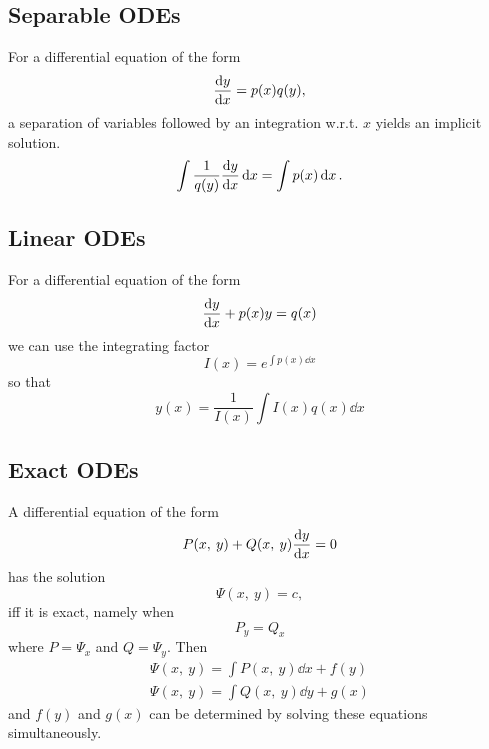 \documentclass{article}
\begin{document}
\subsection{Separable ODEs}
For a differential equation of the form
\begin{equation*}
    \dv{y}{x} = p(x) q(y),
\end{equation*}
a separation of variables followed by an integration w.r.t. \(x\) yields an implicit solution.
\begin{equation*}
    \int \frac{1}{q(y)} \dv{y}{x} \dd{x} = \int p(x) \dd{x}.
\end{equation*}
\subsection{Linear ODEs}
For a differential equation of the form
\begin{equation*}
    \dv{y}{x} + p(x)y = q(x)
\end{equation*}
we can use the integrating factor
\begin{equation*}
    I(x) = e^{\int p(x) \dd{x}}
\end{equation*}
so that
\begin{equation*}
    y(x) = \frac{1}{I(x)} \int I(x) q(x) \dd{x}
\end{equation*}
\subsection{Exact ODEs}
A differential equation of the form
\begin{equation*}
    P(x,\: y) + Q(x,\: y)\dv{y}{x} = 0
\end{equation*}
has the solution
\begin{equation*}
    \Psi(x,\: y) = c,
\end{equation*}
iff it is exact, namely when
\begin{equation*}
    P_y = Q_x
\end{equation*}
where \(P = \Psi_x\) and \(Q = \Psi_y\). Then
\begin{gather*}
    \Psi(x,\: y) = \int P(x,\: y) \dd{x} + f(y) \\
    \Psi(x,\: y) = \int Q(x,\: y) \dd{y} + g(x)
\end{gather*}
and \(f(y)\) and \(g(x)\) can be determined by solving these equations simultaneously.
\newpage
\end{document}
